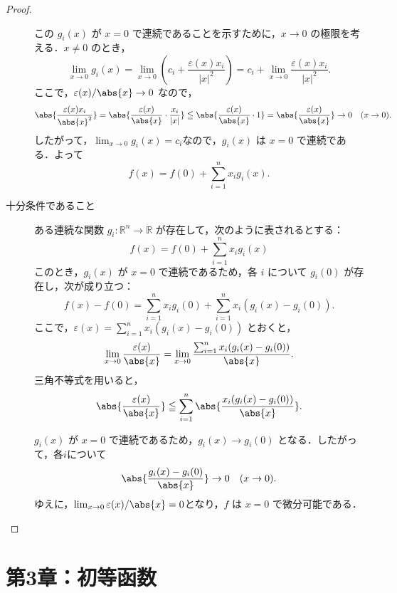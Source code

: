 \documentclass[a4paper,10pt,fleqn]{ltjsarticle}
\begin{document}
\begin{tleftbar}
\begin{proof}
\begin{description}
                  この $ g_i(x) $ が $ x=0 $ で連続であることを示すために，$ x \to 0 $ の極限を考える．$ x \ne 0 $ のとき，
                  \[
                      \lim_{x \to 0} g_i(x) = \lim_{x \to 0} \left( c_i + \frac{\varepsilon(x) x_i}{|x|^2} \right) = c_i + \lim_{x \to 0} \frac{\varepsilon(x) x_i}{|x|^2}.
                  \]
                  ここで，$\varepsilon(x)/\abs{x} \to 0 $ なので，
                  \[
                      \abs{\frac{\varepsilon(x) x_i}{\abs{x}^2}} = \abs{\frac{\varepsilon(x)}{\abs{x}} \cdot \frac{x_i}{|x|}} \leqq  \abs{\frac{\varepsilon(x)}{\abs{x}} \cdot 1} = \abs{\frac{\varepsilon(x)}{\abs{x}}} \to 0 \quad (x \to 0).
                  \]
                  したがって，$\lim_{x \to 0} g_i(x) = c_i$なので，$ g_i(x) $ は $ x=0 $ で連続である．よって
                  \[
                      f(x) = f(0) + \sum_{i=1}^n x_i g_i(x).
                  \]
            \item [十分条件であること]
                  ある連続な関数 $ g_i \colon \mathbb{R}^n \to \mathbb{R} $ が存在して，次のように表されるとする：
                  \[
                      f(x) = f(0) + \sum_{i=1}^n x_i g_i(x)
                  \]
                  このとき，$ g_i(x) $ が $ x=0 $ で連続であるため，各 $ i $ について $ g_i(0) $ が存在し，次が成り立つ：
                  \[
                      f(x) - f(0) = \sum_{i=1}^n x_i g_i(0) + \sum_{i=1}^n x_i (g_i(x) - g_i(0)).
                  \]
                  ここで，$ \varepsilon(x) = \sum_{i=1}^n x_i (g_i(x) - g_i(0)) $ とおくと，
                  \[
                      \lim_{x \to 0} \frac{\varepsilon(x)}{\abs{x}} = \lim_{x \to 0} \frac{\sum_{i=1}^n x_i (g_i(x) - g_i(0))}{\abs{x}}.
                  \]
                  三角不等式を用いると，
                  \[
                      \abs{ \frac{\varepsilon(x)}{\abs{x}} } \leqq \sum_{i=1}^n \abs{ \frac{x_i(g_i(x) - g_i(0))}{\abs{x}} }.
                  \]

                  $ g_i(x) $ が $ x=0 $ で連続であるため，$ g_i(x) \to g_i(0) $ となる．したがって，各$ i $について
                  \[
                      \abs{ \frac{g_i(x) - g_i(0)}{\abs{x}} } \to 0 \quad (x \to 0).
                  \]
                  ゆえに，$\lim_{x \to 0} \varepsilon(x)/\abs{x} = 0$となり，$ f $ は $ x=0 $ で微分可能である．
        \end{description}
    \end{proof}
\end{tleftbar}

\part*{第3章：初等函数}
\end{document}
